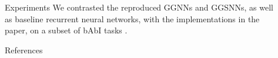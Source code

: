 \documentclass[final,hyperref={pdfpagelabels=false}]{beamer}
\newcommand{\shrink}{-15pt}
\begin{document}
\begin{frame}[t]
\begin{columns}[t]
  \begin{column}{.02\textwidth}\end{column} %
    
  \begin{column}{.3\textwidth} %
  
  \vspace{\shrink}
    \begin{block}{Experiments}
      We contrasted the reproduced GGNNs and GGSNNs, as well as baseline recurrent neural networks, with the implementations in the \cite{DBLP:journals/corr/LiTBZ15} paper, on a subset of bAbI tasks \cite{DBLP:journals/corr/WestonBCM15}.
    \end{block}

    \begin{block}{References}
      \linespread{0.928}\selectfont
      \footnotesize{
      }
    \end{block}

  \end{column} %

  \begin{column}{.02\textwidth}\end{column} %

\end{columns} %

\end{frame} %
\end{document}
